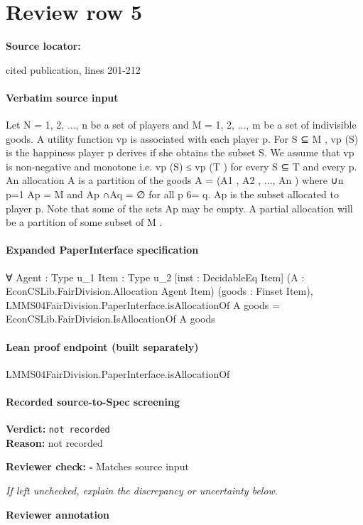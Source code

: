 \documentclass[10pt]{article}
\newcommand{\reviewerbox}{%
  \par\noindent\fbox{\parbox{0.96\linewidth}{\rule{0pt}{0.38in}}}\par
}
\newcommand{\reviewmatch}[1]{%
  \par\noindent\textbf{Reviewer check:} $\square$\; #1\par
  \noindent\emph{If left unchecked, explain the discrepancy or uncertainty below.}\par
}
\begin{document}
\section*{Review row 5}
\textbf{Source locator:} {\footnotesize\raggedright cited publication, lines 201-\allowbreak{}212\par}
\paragraph{Verbatim source input}
\begin{ReviewVerbatim}
Let N = {1, 2, ..., n} be a set of players and M = {1, 2, ...,
m} be a set of indivisible goods. A utility function vp is
associated with each player p. For S ⊆ M , vp (S) is the
happiness player p derives if she obtains the subset S. We
assume that vp is non-negative and monotone i.e. vp (S) ≤
vp (T ) for every S ⊆ T and every p.
An allocation A is a partition of the goods A = (A1 , A2 , ...,
An ) where ∪n
p=1 Ap = M and Ap ∩Aq = ∅ for all p 6= q. Ap is
the subset allocated to player p. Note that some of the sets
Ap may be empty. A partial allocation will be a partition
of some subset of M .
\end{ReviewVerbatim}


\paragraph{Expanded PaperInterface specification}
\begin{ReviewVerbatim}
∀ {Agent : Type u_1} {Item : Type u_2} [inst : DecidableEq Item] (A : EconCSLib.FairDivision.Allocation Agent Item)
  (goods : Finset Item),
  LMMS04FairDivision.PaperInterface.isAllocationOf A goods = EconCSLib.FairDivision.IsAllocationOf A goods
\end{ReviewVerbatim}

\paragraph{Lean proof endpoint (built separately)}\begin{ReviewVerbatim}
LMMS04FairDivision.PaperInterface.isAllocationOf
\end{ReviewVerbatim}

\paragraph{Recorded source-to-Spec screening}
\textbf{Verdict:} \texttt{not recorded}
\\
\textbf{Reason:} not recorded
\reviewmatch{Matches source input}
\noindent\textbf{Reviewer annotation}\par
\reviewerbox
\clearpage
\hypertarget{source-claim-2458ea063371ccee}{}
\end{document}
